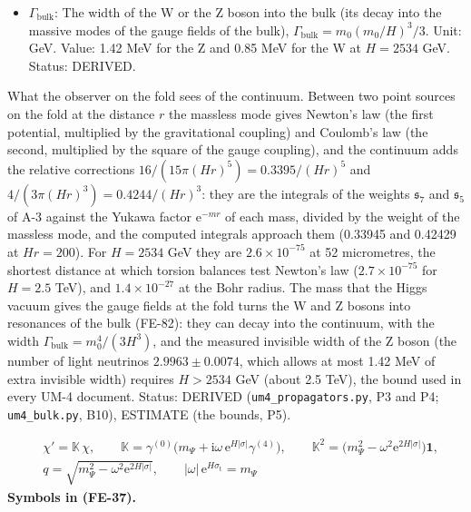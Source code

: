 \documentclass[
  10pt,
]{article}
\begin{document}
\begin{itemize}
  \(H\): The author's constant (an inverse length) that fixes the period
  \(\pi/(6H)\) of \(x_0\), the warp factor
  \(\mathrm{e}^{-2H\lvert\sigma\rvert}\) of the metric, the cosmological
  constant \(\Lambda = -21H^2\) and the tension
  \(\kappa\lambda_{\mathrm{F}} = 12H\) of the fold; in UM-4 a free
  parameter, bounded from below by the propagation of the gauge fields
  in the bulk. Unit: GeV (1/length). Value: \(H > 2534\) GeV, about 2.5
  TeV (from the invisible width of the Z boson). Status: AUTHOR.
\item
  \(\Gamma_{\mathrm{bulk}}\): The width of the W or the Z boson into the
  bulk (its decay into the massive modes of the gauge fields of the
  bulk), \(\Gamma_{\mathrm{bulk}} = m_0(m_0/H)^3/3\). Unit: GeV. Value:
  1.42 MeV for the Z and 0.85 MeV for the W at \(H = 2534\) GeV. Status:
  DERIVED.
\end{itemize}

What the observer on the fold sees of the continuum. Between two point
sources on the fold at the distance \(r\) the massless mode gives
Newton's law (the first potential, multiplied by the gravitational
coupling) and Coulomb's law (the second, multiplied by the square of the
gauge coupling), and the continuum adds the relative corrections
\(16/(15\pi(Hr)^5) = 0.3395/(Hr)^5\) and
\(4/(3\pi(Hr)^3) = 0.4244/(Hr)^3\): they are the integrals of the
weights \(\mathfrak{s}_7\) and \(\mathfrak{s}_5\) of A-3 against the
Yukawa factor \(\mathrm{e}^{-mr}\) of each mass, divided by the weight
of the massless mode, and the computed integrals approach them (0.33945
and 0.42429 at \(Hr = 200\)). For \(H = 2534\) GeV they are
\(2.6\times10^{-75}\) at 52 micrometres, the shortest distance at which
torsion balances test Newton's law (\(2.7\times10^{-75}\) for
\(H = 2.5\) TeV), and \(1.4\times10^{-27}\) at the Bohr radius. The mass
that the Higgs vacuum gives the gauge fields at the fold turns the W and
Z bosons into resonances of the bulk (FE-82): they can decay into the
continuum, with the width \(\Gamma_{\mathrm{bulk}} = m_0^4/(3H^3)\), and
the measured invisible width of the Z boson (the number of light
neutrinos \(2.9963 \pm 0.0074\), which allows at most 1.42 MeV of extra
invisible width) requires \(H > 2534\) GeV (about 2.5 TeV), the bound
used in every UM-4 document. Status: DERIVED
(\texttt{um4\_propagators.py}, P3 and P4; \texttt{um4\_bulk.py}, B10),
ESTIMATE (the bounds, P5).

\[
\begin{aligned}
&\chi' = \mathbb{K}\,\chi,\qquad \mathbb{K} = \gamma^{(0)}\big(m_\Psi + \mathrm{i}\omega\,\mathrm{e}^{H\lvert\sigma\rvert}\gamma^{(4)}\big),\qquad
\mathbb{K}^2 = \big(m_\Psi^2 - \omega^2\mathrm{e}^{2H\lvert\sigma\rvert}\big)\mathbf{1},\\
&q = \sqrt{m_\Psi^2 - \omega^2\mathrm{e}^{2H\lvert\sigma\rvert}},\qquad \lvert\omega\rvert\,\mathrm{e}^{H\sigma_{\mathrm{t}}} = m_\Psi
\end{aligned} \tag{FE-37}
\] \textbf{Symbols in (FE-37).}
\end{document}
